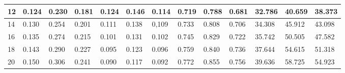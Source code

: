 \begin{table*}[t!]
\begin{tabular}{|l | lll| lll |lll |lll|}
		12 & 0.124   & 0.230   & 0.181  & 0.124    & 0.146    &  0.114   & 0.719     & 0.788    & 0.681    & 32.786     & 40.659     & 38.373     \\ \hline
		14 & 0.130   & 0.254   & 0.201  & 0.111    & 0.138    & 0,109   &  0.733     & 0.808    & 0.706    & 34.308     & 45.912     & 43.098     \\ \hline
		16 & 0.135   & 0.274   & 0.215  &  0.101    & 0.131    & 0.102   & 0.745    & 0.829    & 0.722    & 35.742     & 50.505     & 47.582     \\ \hline
		18 & 0.143   & 0.290   & 0.227  & 0.095   & 0.123    & 0.096   & 0.759     & 0.840    & 0.736    & 37.644     & 54.615     & 51.318     \\ \hline
		20 & 0.150   & 0.306   & 0.241  & 0.090    & 0.117    & 0.092   & 0.772     & 0.855    & 0.756    & 39.636    & 58.725     & 54.923    \\ \hline
	\end{tabular}
	\vspace{.2cm}
	\label{tab:combined_dt20}
\end{table*}